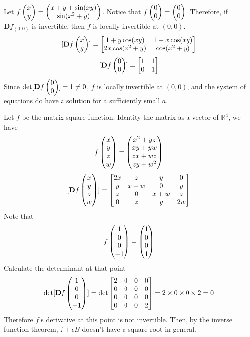 \documentclass{homework}
\begin{document}
\begin{problem}{4}
Let $f\begin{pmatrix}x\\y\end{pmatrix} = \begin{pmatrix}x+y+\sin(xy)\\\sin(x^2+y)\end{pmatrix}$. Notice that $f\begin{pmatrix}0\\0\end{pmatrix} = \begin{pmatrix}0\\0\end{pmatrix}$. Therefore, if $\mathbf{D}f_{(0,0)}$ is invertible, then $f$ is locally invertible at $(0, 0)$.
$$[\mathbf{D}f\begin{pmatrix}x\\y\end{pmatrix}] = \begin{bmatrix}1+y\cos(xy)&1+x\cos(xy)\\2x\cos(x^2+y)&\cos(x^2+y)\end{bmatrix}$$
$$[\mathbf{D}f\begin{pmatrix}0\\0\end{pmatrix}] = \begin{bmatrix}1&1\\0&1\end{bmatrix}$$
Since $\det[\mathbf{D}f\begin{pmatrix}0\\0\end{pmatrix}] = 1 \ne 0$, $f$ is locally invertible at $(0, 0)$, and the system of equations do have a solution for a sufficiently small $a$.
\end{problem}

\begin{problem}{5}
Let $f$ be the matrix square function. Identity the matrix as a vector of $\mathbb{R}^4$, we have
$$f\begin{pmatrix}x\\y\\z\\w\end{pmatrix} = \begin{pmatrix}x^2+yz\\xy+yw\\zx+wz\\zy+w^2\end{pmatrix}$$
$$[\mathbf{D}f\begin{pmatrix}x\\y\\z\\w\end{pmatrix}] = \begin{bmatrix}2x &   z &  y  &  0\\
                            y & x+w &  0  &  y\\
                            z &   0 & x+w &  z\\
                            0 &   z &  y  & 2w\end{bmatrix}$$
Note that
$$f\begin{pmatrix}1\\0\\0\\-1\end{pmatrix}=\begin{pmatrix}1\\0\\0\\1\end{pmatrix}$$
Calculate the determinant at that point
$$\det[\mathbf{D}f\begin{pmatrix}1\\0\\0\\-1\end{pmatrix}] = \det\begin{bmatrix}2&0&0&0\\0&0&0&0\\0&0&0&0\\0&0&0&2\end{bmatrix} = 2\times0\times0\times2 = 0$$
Therefore $f$'s derivative at this point is not invertible. Then, by the inverse function theorem, $I + \epsilon B$ doesn't have a square root in general.
\end{problem}
\end{document}
